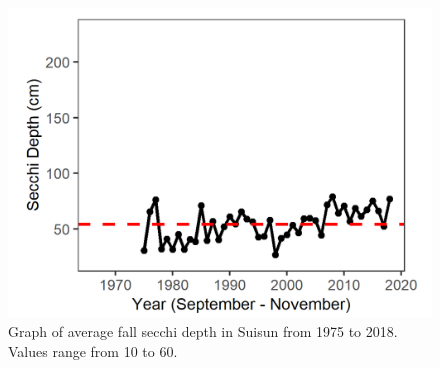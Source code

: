 \documentclass[
]{book}
\begin{document}
\begin{panel-grid}
\begin{columns-nocenter}
\begin{column800}
\begin{expand}
\end{expand}

\end{column800}

\begin{column40}

~

\end{column40}

\begin{column800}

\begin{expand}

\begin{figure}
\includegraphics[width=15.25in]{figures/secchi_ssfall} \caption{Graph of average fall secchi depth in Suisun from 1975 to 2018. Values range from 10 to 60.}\label{fig:unnamed-chunk-97}
\end{figure}

\end{expand}

\end{column800}

\begin{column40}

~

\end{column40}

\begin{column800}

\begin{expand}


\end{expand}
\end{column800}
\end{columns-nocenter}
\end{panel-grid}
\end{document}
